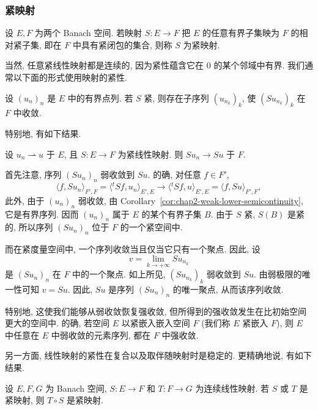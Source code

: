 \subsubsection{紧映射}
\label{subsec:chap2-compact-maps}

\begin{Definition}
\label{def:chap2-compact-map}
设 $E,F$ 为两个 Banach 空间. 若映射 $S:E\to F$ 把 $E$ 的任意有界子集映为 $F$ 的相对紧子集, 即在 $F$ 中具有紧闭包的集合, 则称 $S$ 为紧映射.
\end{Definition}

当然, 任意紧线性映射都是连续的, 因为紧性蕴含它在 $0$ 的某个邻域中有界. 我们通常以下面的形式使用映射的紧性.

设 $(u_n)_n$ 是 $E$ 中的有界点列. 若 $S$ 紧, 则存在子序列 $(u_{n_k})_k$, 使 $(Su_{n_k})_k$ 在 $F$ 中收敛.

特别地, 有如下结果.

\begin{Proposition}
\label{prop:chap2-compact-map-weak-to-strong}
设 $u_n\rightharpoonup u$ 于 $E$, 且 $S:E\to F$ 为紧线性映射. 则 $Su_n\to Su$ 于 $F$.
\end{Proposition}

\begin{Proof}
首先注意, 序列 $(Su_n)_n$ 弱收敛到 $Su$. 的确, 对任意 $f\in F'$,
\[
 \langle f,Su_n\rangle_{F',F}=\langle{}^tSf,u_n\rangle_{E',E}
 \longrightarrow\langle{}^tSf,u\rangle_{E',E}=\langle f,Su\rangle_{F',F},
\]
此外, 由于 $(u_n)_n$ 弱收敛, 由 Corollary~\ref{cor:chap2-weak-lower-semicontinuity}, 它是有界序列. 因而 $(u_n)_n$ 属于 $E$ 的某个有界子集 $B$. 由于 $S$ 紧, $S(B)$ 是紧的, 所以序列 $(Su_n)_n$ 位于 $F$ 的一个紧空间中.

而在紧度量空间中, 一个序列收敛当且仅当它只有一个聚点. 因此, 设
\[
 v=\lim_{k\to+\infty}Su_{n_k}
\]
是 $(Su_n)_n$ 在 $F$ 中的一个聚点. 如上所见, $(Su_{n_k})_k$ 弱收敛到 $Su$. 由弱极限的唯一性可知 $v=Su$. 因此, $Su$ 是序列 $(Su_n)_n$ 的唯一聚点, 从而该序列收敛.
\end{Proof}

特别地, 这使我们能够从弱收敛恢复强收敛, 但所得到的强收敛发生在比初始空间更大的空间中. 的确, 若空间 $E$ 以紧嵌入嵌入空间 $F$ (我们称 $E$ 紧嵌入 $F$), 则 $E$ 中任意在 $E$ 中弱收敛的元素序列, 都在 $F$ 中强收敛.

另一方面, 线性映射的紧性在复合以及取伴随映射时是稳定的. 更精确地说, 有如下结果.

\begin{Lemma}
\label{lem:chap2-compact-composition}
设 $E,F,G$ 为 Banach 空间, $S:E\to F$ 和 $T:F\to G$ 为连续线性映射. 若 $S$ 或 $T$ 是紧映射, 则 $T\circ S$ 是紧映射.
\end{Lemma}

